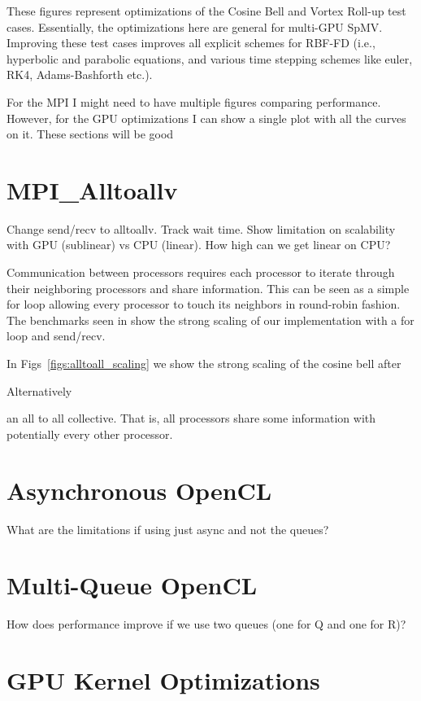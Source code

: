 
These figures represent optimizations of the Cosine Bell and Vortex Roll-up test cases. Essentially, the optimizations here are general for multi-GPU SpMV. Improving these test cases improves all explicit schemes for RBF-FD (i.e., hyperbolic and parabolic equations, and various time stepping schemes like euler, RK4, Adams-Bashforth etc.). 


For the MPI I might need to have multiple figures comparing performance. However, for the GPU optimizations I can show a single plot with all the curves on it. These sections will be good 

\section{MPI\_Alltoallv}
Change send/recv to alltoallv. Track wait time. Show limitation on scalability with GPU (sublinear) vs CPU (linear). How high can we get linear on CPU? 


Communication between processors requires each processor to iterate through their neighboring processors and share information. This can be seen as a simple for loop allowing every processor to touch its neighbors in round-robin fashion. The benchmarks seen in  show the strong scaling of our implementation with a for loop and send/recv. 

In Figs~\ref{figs:alltoall_scaling} we show the strong scaling of the cosine bell after 

Alternatively

an all to all collective. That is, all processors share some information with potentially every other processor. 

\section{Asynchronous OpenCL}

What are the limitations if using just async and not the queues?

\section{Multi-Queue OpenCL}
How does performance improve if we use two queues (one for Q and one for R)? 

\section{GPU Kernel Optimizations}

